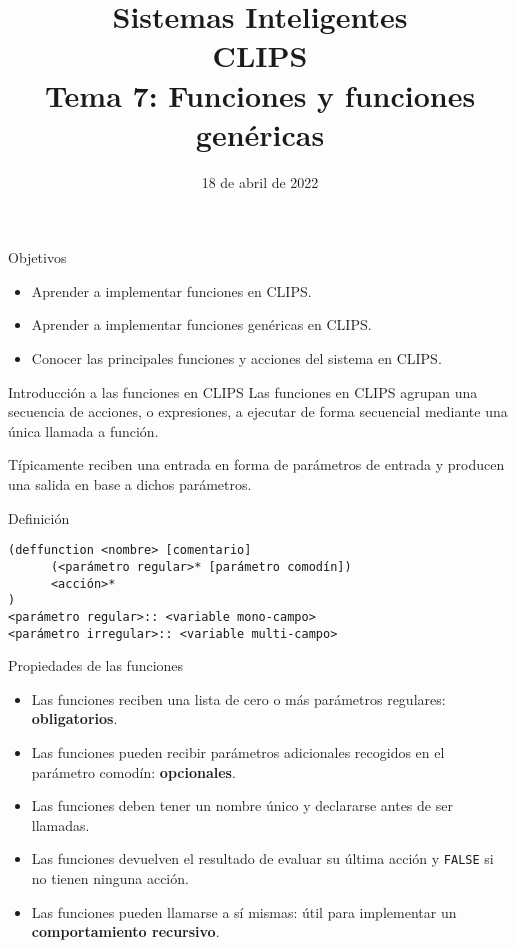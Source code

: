 \documentclass[usenames,dvipsnames,aspectratio=169]{beamer}
\title[]{{\LARGE Sistemas Inteligentes\\CLIPS}\\[0.3cm]Tema 7: Funciones y funciones genéricas}
\date[Marzo, 2022]{18 de abril de 2022}
\author[A. Esteban]{\texorpdfstring{
    \begin{minipage}{0.47\linewidth}
        Aurora Esteban Toscano
        \pdfnewline
        \texttt{aestebant@uco.es}
    \end{minipage}
}{Aurora Esteban Toscano}
}
\institute{Grado en Ingeniería Informática, Universidad de Córdoba}
\begin{document}

\begin{frame}
\titlepage
\end{frame}

\begin{frame}{Objetivos}
	\begin{itemize}
		\item Aprender a implementar funciones en CLIPS.
		\item Aprender a implementar funciones genéricas en CLIPS.
		\item Conocer las principales funciones y acciones del sistema en CLIPS.
	\end{itemize}
\end{frame}

\begin{frame}[fragile]{Introducción a las funciones en CLIPS}
	Las funciones en CLIPS agrupan una secuencia de acciones, o expresiones, a ejecutar de forma secuencial mediante una única llamada a función.
	
	Típicamente reciben una entrada en forma de parámetros de entrada y producen una salida en base a dichos parámetros.
	
	\begin{block}{Definición}
		\begin{verbatim}
(deffunction <nombre> [comentario]
      (<parámetro regular>* [parámetro comodín])
      <acción>*
)
<parámetro regular>:: <variable mono-campo>
<parámetro irregular>:: <variable multi-campo>
		\end{verbatim}
	\end{block}
\end{frame}

\begin{frame}{Propiedades de las funciones}
	\begin{itemize}
		\item Las funciones reciben una lista de cero o más parámetros regulares: \textbf{obligatorios}.
		\item Las funciones pueden recibir parámetros adicionales recogidos en el parámetro comodín: \textbf{opcionales}.
		\item Las funciones deben tener un nombre único y declararse antes de ser llamadas.
		\item Las funciones devuelven el resultado de evaluar su última acción y \texttt{FALSE} si no tienen ninguna acción.
		\item Las funciones pueden llamarse a sí mismas: útil para implementar un \textbf{comportamiento recursivo}.
	\end{itemize}
\end{frame}
\end{document}
